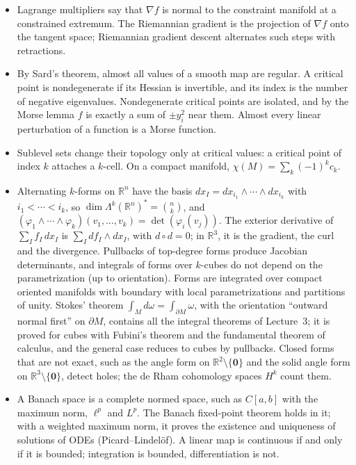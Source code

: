 \documentclass[11pt]{article}
\theoremstyle{definition}
\theoremstyle{plain}
\theoremstyle{remark}
\begin{document}
\begin{itemize}[leftmargin=*]
    \item Lagrange multipliers say that $\nabla f$ is normal to the constraint manifold at a constrained extremum. The Riemannian gradient is the projection of $\nabla f$ onto the tangent space; Riemannian gradient descent alternates such steps with retractions.
    \item By Sard's theorem, almost all values of a smooth map are regular. A critical point is nondegenerate if its Hessian is invertible, and its index is the number of negative eigenvalues. Nondegenerate critical points are isolated, and by the Morse lemma $f$ is exactly a sum of $\pm y_i^2$ near them. Almost every linear perturbation of a function is a Morse function.
    \item Sublevel sets change their topology only at critical values: a critical point of index $k$ attaches a $k$-cell. On a compact manifold, $\chi(M) = \sum_k (-1)^k c_k$.
    \item Alternating $k$-forms on $\mathbb{R}^n$ have the basis $dx_I = dx_{i_1} \wedge \cdots \wedge dx_{i_k}$ with $i_1 < \cdots < i_k$, so $\dim \Lambda^k(\mathbb{R}^n)^* = \binom{n}{k}$, and $(\varphi_1 \wedge \cdots \wedge \varphi_k)(v_1, \ldots, v_k) = \det(\varphi_i(v_j))$. The exterior derivative of $\sum_I f_I\, dx_I$ is $\sum_I df_I \wedge dx_I$, with $d \circ d = 0$; in $\mathbb{R}^3$, it is the gradient, the curl and the divergence. Pullbacks of top-degree forms produce Jacobian determinants, and integrals of forms over $k$-cubes do not depend on the parametrization (up to orientation). Forms are integrated over compact oriented manifolds with boundary with local parametrizations and partitions of unity. Stokes' theorem $\int_M d\omega = \int_{\partial M} \omega$, with the orientation ``outward normal first'' on $\partial M$, contains all the integral theorems of Lecture~3; it is proved for cubes with Fubini's theorem and the fundamental theorem of calculus, and the general case reduces to cubes by pullbacks. Closed forms that are not exact, such as the angle form on $\mathbb{R}^2 \setminus \{\mathbf{0}\}$ and the solid angle form on $\mathbb{R}^3 \setminus \{\mathbf{0}\}$, detect holes; the de Rham cohomology spaces $H^k$ count them.
    \item A Banach space is a complete normed space, such as $C[a, b]$ with the maximum norm, $\ell^p$ and $L^p$. The Banach fixed-point theorem holds in it; with a weighted maximum norm, it proves the existence and uniqueness of solutions of ODEs (Picard--Lindel\"of). A linear map is continuous if and only if it is bounded; integration is bounded, differentiation is not.

\end{itemize}
\end{document}
